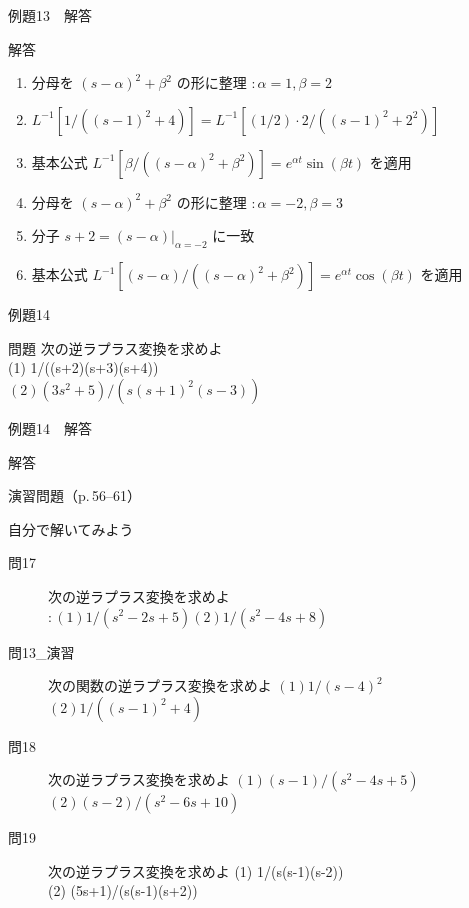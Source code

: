 \documentclass[aspectratio=43,professionalfonts,handout]{beamer}
\begin{document}
\begin{frame}{例題13　解答}
  \begin{exampleblock}{解答}
  \begin{enumerate}[1.]
    \item[] 分母を $(s-\alpha)^{2}+\beta^{2}$ の形に整理 $: \alpha=1, \beta=2$
    \item[] $L^{-1}[1/((s-1)^{2}+4)] = L^{-1}[(1/2)\cdot2/((s-1)^{2}+2^{2})]$
    \item[] 基本公式 $L^{-1}[\beta/((s-\alpha)^{2}+\beta^{2})] = e^{\alpha t}\sin(\beta t)$ を適用
    \item[] 分母を $(s-\alpha)^{2}+\beta^{2}$ の形に整理 $: \alpha=-2, \beta=3$
    \item[] 分子 $s+2 = (s-\alpha)|_{\alpha=-2}$ に一致
    \item[] 基本公式 $L^{-1}[(s-\alpha)/((s-\alpha)^{2}+\beta^{2})] = e^{\alpha t}\cos(\beta t)$ を適用
  \end{enumerate}
  \end{exampleblock}
\end{frame}

\begin{frame}{例題14}
  \begin{exampleblock}{問題}
    次の逆ラプラス変換を求めよ\\[2pt]
    (1) 1/((s+2)(s+3)(s+4))\\[2pt]
    $(2) (3s^{2}+5) / (s(s+1)^{2}(s-3))$\\[2pt]
  \end{exampleblock}
\end{frame}

\begin{frame}{例題14　解答}
  \begin{exampleblock}{解答}
  \end{exampleblock}
\end{frame}

\begin{frame}{演習問題（p.\,56--61）}
  \begin{exampleblock}{自分で解いてみよう}
  \begin{description}
    \item[問17] 次の逆ラプラス変換を求めよ $: (1) 1/(s^{2}-2s+5) (2) 1/(s^{2}-4s+8)$
    \item[問13\_演習] 次の関数の逆ラプラス変換を求めよ
    $(1) 1/(s-4)^{2}$\\
    $(2) 1/((s-1)^{2}+4)$\\
    \item[問18] 次の逆ラプラス変換を求めよ
    $(1) (s-1)/(s^{2}-4s+5)$\\
    $(2) (s-2)/(s^{2}-6s+10)$\\
    \item[問19] 次の逆ラプラス変換を求めよ
    (1) 1/(s(s-1)(s-2))\\
    (2) (5s+1)/(s(s-1)(s+2))\\
  \end{description}
  \end{exampleblock}
\end{frame}
\end{document}
